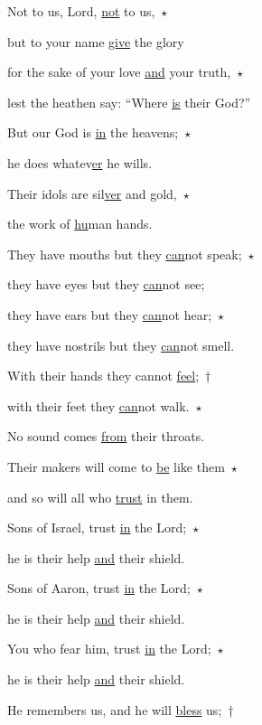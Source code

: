 \noindent Not to us, Lord, \uline{not} to us,~$\star$~\nopagebreak

but to your name \uline{give} the glory

\noindent for the sake of your love \uline{and} your truth,~$\star$~\nopagebreak

lest the heathen say: “Where \uline{is} their God?”



\noindent But our God is \uline{in} the heavens;~$\star$~\nopagebreak

he does whatev\uline{er} he wills.

\noindent Their idols are sil\uline{ver} and gold,~$\star$~\nopagebreak

the work of \uline{hu}man hands.



\noindent They have mouths but they \uline{can}not speak;~$\star$~\nopagebreak

they have eyes but they \uline{can}not see;

\noindent they have ears but they \uline{can}not hear;~$\star$~\nopagebreak

they have nostrils but they \uline{can}not smell.



\noindent With their hands they cannot \uline{feel};~†~

with their feet they \uline{can}not walk.~$\star$~\nopagebreak

No sound comes \uline{from} their throats.



\noindent Their makers will come to \uline{be} like them~$\star$~\nopagebreak

and so will all who \uline{trust} in them.



\noindent Sons of Israel, trust \uline{in} the Lord;~$\star$~\nopagebreak

he is their help \uline{and} their shield.

\noindent Sons of Aaron, trust \uline{in} the Lord;~$\star$~\nopagebreak

he is their help \uline{and} their shield.



\noindent You who fear him, trust \uline{in} the Lord;~$\star$~\nopagebreak

he is their help \uline{and} their shield.

\noindent He remembers us, and he will \uline{bless} us;~†~

